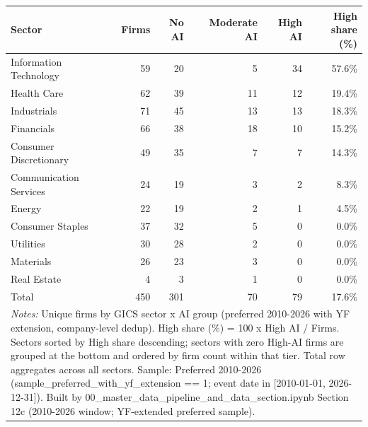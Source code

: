 \begin{tabular}{lrrrrr}
\toprule
Sector & Firms & No AI & Moderate AI & High AI & High share (\%) \\
\midrule
Information Technology & 59 & 20 & 5 & 34 & 57.6\% \\
Health Care & 62 & 39 & 11 & 12 & 19.4\% \\
Industrials & 71 & 45 & 13 & 13 & 18.3\% \\
Financials & 66 & 38 & 18 & 10 & 15.2\% \\
Consumer Discretionary & 49 & 35 & 7 & 7 & 14.3\% \\
Communication Services & 24 & 19 & 3 & 2 & 8.3\% \\
Energy & 22 & 19 & 2 & 1 & 4.5\% \\
Consumer Staples & 37 & 32 & 5 & 0 & 0.0\% \\
Utilities & 30 & 28 & 2 & 0 & 0.0\% \\
Materials & 26 & 23 & 3 & 0 & 0.0\% \\
Real Estate & 4 & 3 & 1 & 0 & 0.0\% \\
Total & 450 & 301 & 70 & 79 & 17.6\% \\
\bottomrule
\multicolumn{6}{p{0.95\linewidth}}{\footnotesize \textit{Notes:} Unique firms by GICS sector x AI group (preferred 2010-2026 with YF extension, company-level dedup). High share (\%) = 100 x High AI / Firms. Sectors sorted by High share descending; sectors with zero High-AI firms are grouped at the bottom and ordered by firm count within that tier. Total row aggregates across all sectors. Sample: Preferred 2010-2026 (sample\_preferred\_with\_yf\_extension == 1; event date in [2010-01-01, 2026-12-31]). Built by 00\_master\_data\_pipeline\_and\_data\_section.ipynb Section 12c (2010-2026 window; YF-extended preferred sample).} \\
\end{tabular}
